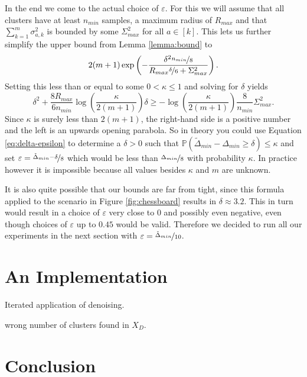 \documentclass[10pt,a4paper]{article}
\begin{document}
In the end we come to the actual choice of $\varepsilon$.
For this we will assume that all clusters have at least $n_{min}$ samples, a maximum radius of $R_{max}$ and that $\sum_{k = 1}^{m} \sigma_{a,k}^{2}$ is bounded by some $\Sigma_{max}^{2}$ for all $a \in [k]$.
This lets us further simplify the upper bound from Lemma \ref{lemma:bound} to
\begin{equation*}
  2(m + 1)\exp\left( -\frac{\delta^{2} \nicefrac{n_{min}}{8}}{R_{max} \nicefrac{\delta}{6} + \Sigma_{max}^{2}} \right).
\end{equation*}
Setting this less than or equal to some $0 < \kappa \le 1$ and solving for $\delta$ yields
\begin{equation}
  \delta^{2} + \frac{8R_{max}}{6n_{min}}\log\left( \frac{\kappa}{2(m + 1)} \right)\delta \ge -\log\left( \frac{\kappa}{2(m + 1)} \right)\frac{8}{n_{min}}\Sigma_{max}^{2}.
  \label{eq:delta-epsilon}
\end{equation}
Since $\kappa$ is surely less than $2(m + 1)$, the right-hand side is a positive number and the left is an upwards opening parabola.
So in theory you could use Equation \eqref{eq:delta-epsilon} to determine a $\delta > 0$ such that $\mathbb{P}(\tilde{\Delta}_{min} - \Delta_{min} \ge \delta) \le \kappa$ and set $\varepsilon = \nicefrac{\tilde{\Delta}_{min} - \delta}{8}$ which would be less than $\nicefrac{\Delta_{min}}{8}$ with probability $\kappa$.
In practice however it is impossible because all values besides $\kappa$ and $m$ are unknown.

It is also quite possible that our bounds are far from tight, since this formula applied to the scenario in Figure \ref{fig:chessboard} results in $\delta \approx 3.2$.
This in turn would result in a choice of $\varepsilon$ very close to $0$ and possibly even negative, even though choices of $\varepsilon$ up to $0.45$ would be valid.
Therefore we decided to run all our experiments in the next section with $\varepsilon = \nicefrac{\tilde{\Delta}_{min}}{10}$.

\section{An Implementation}
\label{sec:results}

Iterated application of denoising.

wrong number of clusters found in $X_{D}$.

\section{Conclusion}
\label{sec:conclusion}
\end{document}
